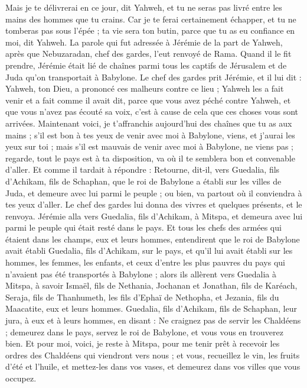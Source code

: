 \begin{multicols}{2}
Mais je te délivrerai en ce jour, dit Yahweh, et tu ne seras pas livré entre les mains des hommes que tu crains.
Car je te ferai certainement échapper, et tu ne tomberas pas sous l'épée ; ta vie sera ton butin, parce que tu as eu confiance en moi, dit Yahweh.
\VerseOne{}La parole qui fut adressée à Jérémie de la part de Yahweh, après que Nebuzaradan, chef des gardes, l'eut renvoyé de Rama. Quand il le fit prendre, Jérémie était lié de chaînes parmi tous les captifs de Jérusalem et de Juda qu'on transportait à Babylone.
Le chef des gardes prit Jérémie, et il lui dit : Yahweh, ton Dieu, a prononcé ces malheurs contre ce lieu ;
Yahweh les a fait venir et a fait comme il avait dit, parce que vous avez péché contre Yahweh, et que vous n'avez pas écouté sa voix, c’est à cause de cela que ces choses vous sont arrivées.
Maintenant voici, je t’affranchis aujourd'hui des chaînes que tu as aux mains ; s'il est bon à tes yeux de venir avec moi à Babylone, viens, et j’aurai les yeux sur toi ; mais s'il est mauvais de venir avec moi à Babylone, ne viens pas ; regarde, tout le pays est à ta disposition, va où il te semblera bon et convenable d'aller.
Et comme il tardait à répondre : Retourne, dit-il, vers Guedalia, fils d'Achikam, fils de Schaphan, que le roi de Babylone a établi sur les villes de Juda, et demeure avec lui parmi le peuple ; ou bien, va partout où il conviendra à tes yeux d'aller. Le chef des gardes lui donna des vivres et quelques présents, et le renvoya.
Jérémie alla vers Guedalia, fils d'Achikam, à Mitspa, et demeura avec lui parmi le peuple qui était resté dans le pays.
Et tous les chefs des armées qui étaient dans les champs, eux et leurs hommes, entendirent que le roi de Babylone avait établi Guedalia, fils d'Achikam, sur le pays, et qu'il lui avait établi sur les hommes, les femmes, les enfants, et ceux d'entre les plus pauvres du pays qui n'avaient pas été transportés à Babylone ;
alors ils allèrent vers Guedalia à Mitspa, à savoir Ismaël, fils de Nethania, Jochanan et Jonathan, fils de Karéach, Seraja, fils de Thanhumeth, les fils d’Ephaï de Nethopha, et Jezania, fils du Maacatite, eux et leurs hommes.
Guedalia, fils d'Achikam, fils de Schaphan, leur jura, à eux et à leurs hommes, en disant : Ne craignez pas de servir les Chaldéens ; demeurez dans le pays, servez le roi de Babylone, et vous vous en trouverez bien.
Et pour moi, voici, je reste à Mitspa, pour me tenir prêt à recevoir les ordres des Chaldéens qui viendront vers nous ; et vous, recueillez le vin, les fruits d’été et l'huile, et mettez-les dans vos vases, et demeurez dans vos villes que vous occupez.

\end{multicols}
